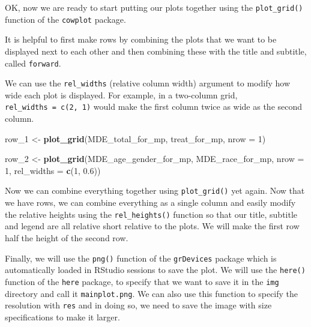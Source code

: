 \documentclass[
]{article}
\newenvironment{Shaded}{\begin{snugshade}}{\end{snugshade}}
\newcommand{\DataTypeTok}[1]{\textcolor[rgb]{0.13,0.29,0.53}{#1}}
\newcommand{\DecValTok}[1]{\textcolor[rgb]{0.00,0.00,0.81}{#1}}
\newcommand{\FloatTok}[1]{\textcolor[rgb]{0.00,0.00,0.81}{#1}}
\newcommand{\KeywordTok}[1]{\textcolor[rgb]{0.13,0.29,0.53}{\textbf{#1}}}
\newcommand{\NormalTok}[1]{#1}
\newcommand{\StringTok}[1]{\textcolor[rgb]{0.31,0.60,0.02}{#1}}
\begin{document}
OK, now we are ready to start putting our plots together using the
\texttt{plot\_grid()} function of the \texttt{cowplot} package.

It is helpful to first make rows by combining the plots that we want to
be displayed next to each other and then combining these with the title
and subtitle, called \texttt{forward}.

We can use the \texttt{rel\_widths} (relative column width) argument to
modify how wide each plot is displayed. For example, in a two-column
grid, \texttt{rel\_widths\ =\ c(2,\ 1)} would make the first column
twice as wide as the second column.

\begin{Shaded}
\begin{Highlighting}[]
\NormalTok{row_}\DecValTok{1}\NormalTok{ <-}\StringTok{ }\KeywordTok{plot_grid}\NormalTok{(MDE_total_for_mp,}
\NormalTok{                   treat_for_mp,}
                   \DataTypeTok{nrow =} \DecValTok{1}\NormalTok{)}

\NormalTok{row_}\DecValTok{2}\NormalTok{ <-}\StringTok{ }\KeywordTok{plot_grid}\NormalTok{(MDE_age_gender_for_mp,}
\NormalTok{                   MDE_race_for_mp,}
                   \DataTypeTok{nrow =} \DecValTok{1}\NormalTok{, }
                   \DataTypeTok{rel_widths =} \KeywordTok{c}\NormalTok{(}\DecValTok{1}\NormalTok{, }\FloatTok{0.6}\NormalTok{))}
\end{Highlighting}
\end{Shaded}

Now we can combine everything together using \texttt{plot\_grid()} yet
again. Now that we have rows, we can combine everything as a single
column and easily modify the relative heights using the
\texttt{rel\_heights()} function so that our title, subtitle and legend
are all relative short relative to the plots. We will make the first row
half the height of the second row.

Finally, we will use the \texttt{png()} function of the
\texttt{grDevices} package which is automatically loaded in RStudio
sessions to save the plot. We will use the \texttt{here()} function of
the \texttt{here} package, to specify that we want to save it in the
\texttt{img} directory and call it \texttt{mainplot.png}. We can also
use this function to specify the resolution with \texttt{res} and in
doing so, we need to save the image with size specifications to make it
larger.
\end{document}
